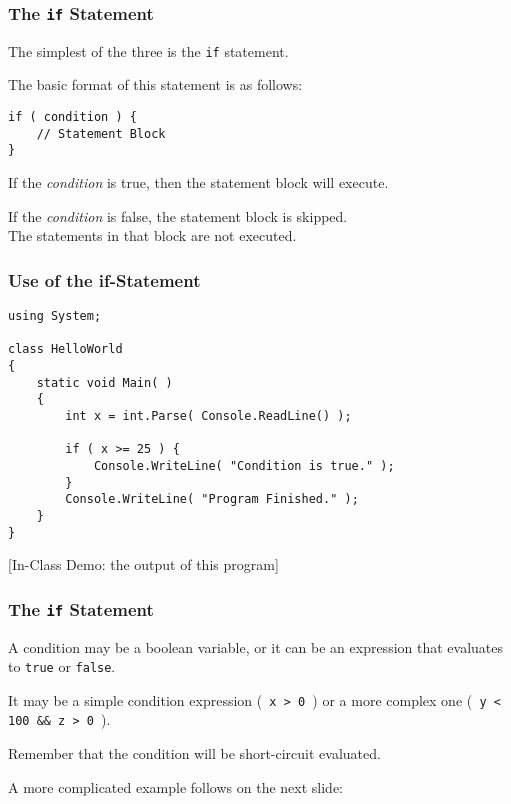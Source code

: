 \begin{frame}[fragile]
\frametitle{The \texttt{if} Statement}

The simplest of the three is the \texttt{if} statement.

The basic format of this statement is as follows:

\begin{verbatim}
if ( condition ) {
    // Statement Block
}
\end{verbatim}

If the \textit{condition} is true, then the statement block will execute.

If the \textit{condition} is false, the statement block is skipped.\\
\quad The statements in that block are not executed.

\end{frame}

\begin{frame}[fragile]
\frametitle{Use of the if-Statement}

\begin{verbatim}
using System;

class HelloWorld
{
    static void Main( )
    {
        int x = int.Parse( Console.ReadLine() );
        
        if ( x >= 25 ) {
            Console.WriteLine( "Condition is true." );
        }
        Console.WriteLine( "Program Finished." );
    }
}
\end{verbatim}

[In-Class Demo: the output of this program]

\end{frame}

\begin{frame}
\frametitle{The \texttt{if} Statement}
A condition may be a boolean variable, or it can be an expression that evaluates to \texttt{true} or \texttt{false}.

It may be a simple condition expression (\texttt{ x > 0 }) or a more complex one (\texttt{ y < 100 \&\& z > 0 }).

Remember that the condition will be short-circuit evaluated.

A more complicated example follows on the next slide:

\end{frame}

